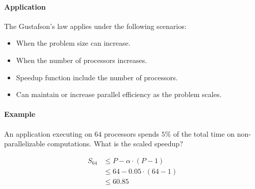 \paragraph{Application}

The Gustafson’s law applies under the following scenarios:
\begin{itemize}
    \item When the problem size can increase.
    \item When the number of processors increases.
    \item Speedup function include the number of processors.
    \item Can maintain or increase parallel efficiency as the problem scales.
\end{itemize}

\paragraph{Example} An application executing on $64$ processors spends $5\%$ of the total time on non-parallelizable computations.
What is the scaled speedup?

\begin{equation}
    \begin{split}
        S_64 & \le P - \alpha \cdot (P-1)\\
        & \le 64 - 0.05 \cdot (64 - 1)\\
        & \le 60.85
    \end{split}
\end{equation}